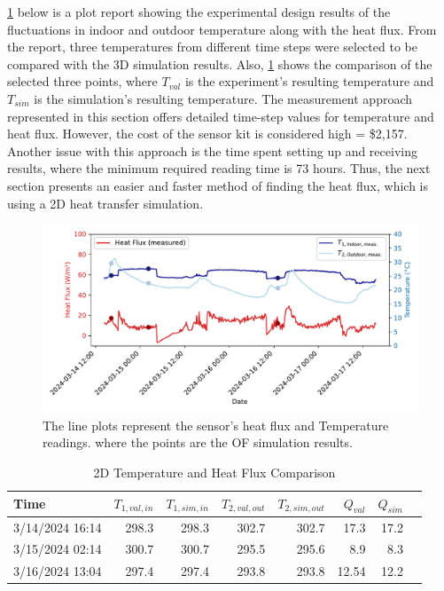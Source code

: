 \ref{fig:expr} below is a plot report showing the experimental design results of the fluctuations in indoor and outdoor temperature along with the heat flux. From the report, three temperatures from different time steps were selected to be compared with the 3D simulation results. Also, \ref{table2d} shows the comparison of the selected three points, where $T_{val}$ is the experiment's resulting temperature and $T_{sim}$ is the simulation's resulting temperature. 
The measurement approach represented in this section offers detailed time-step values for temperature and heat flux. However, the cost of the sensor kit is considered high = \$2,157. Another issue with this approach is the time spent setting up and receiving results, where the minimum required reading time is 73 hours. Thus, the next section presents an easier and faster method of finding the heat flux, which is using a 2D heat transfer simulation.

\begin{figure}[htb]
     \centering
    \includegraphics[width=1\linewidth]{Figures/Validation}
     \caption[2D Experimental Report Plot]{The line plots represent the sensor's heat flux and Temperature readings. where the points are the \gls{OF} simulation results.}
   \label{fig:expr}
 \end{figure}


\begin{table}[tbh]
    \caption{2D Temperature and Heat Flux Comparison}
    \label{table2d}
    \centering
    \begin{tabular}{lrrrrrrr}
        \toprule
        Time                & $T_{1,val,in}$ & $T_{1,sim,in}$ & $T_{2,val,out}$& $T_{2,sim,out}$ & $Q_{val}$ & $Q_{sim}$ \\
        \midrule
        3/14/2024 16:14 & 298.3    & 298.3    & 302.7     & 302.7     & 17.3 & 17.2 \\
        3/15/2024 02:14  & 300.7    & 300.7   & 295.5    & 295.6     & 8.9  & 8.3  \\
        3/16/2024 13:04 & 297.4  & 297.4   & 293.8   & 293.8   & 12.54 & 12.2  \\
        \bottomrule
    \end{tabular}
   
\end{table}




